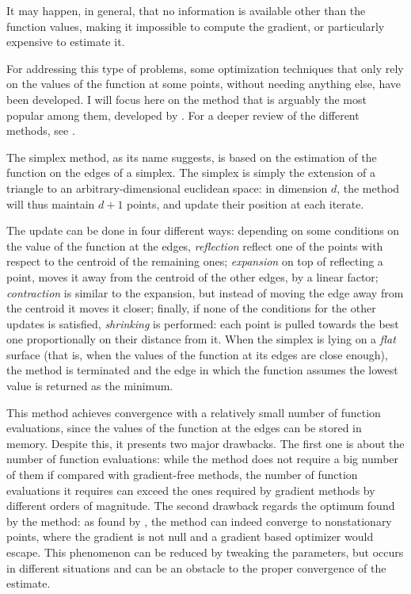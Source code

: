 It may happen, in general, that no information is available other than the function values,
making it impossible to compute the gradient,
or particularly expensive to estimate it.

For addressing this type of problems, some optimization techniques that only rely on the values of the function at some points,
without needing anything else,
have been developed.
I will focus here on the method that is arguably the most popular among them,
developed by \textcite{10.1093/comjnl/7.4.308}.
For a deeper review of the different methods, see \cite{10.5555/1508119}.

The simplex method, as its name suggests, is based on the estimation of the function on the edges of a simplex.
The simplex is simply the extension of a triangle to an arbitrary-dimensional euclidean space:
in dimension \(d\), the method will thus maintain \(d+1\) points,
and update their position at each iterate.

The update can be done in four different ways:
depending on some conditions on the value of the function at the edges,
\textit{reflection} reflect one of the points with respect to the centroid of the remaining ones;
\textit{expansion} on top of reflecting a point, moves it away from the centroid of the other edges, by a linear factor;
\textit{contraction} is similar to the expansion, but instead of moving the edge away from the centroid it moves it closer;
finally, if none of the conditions for the other updates is satisfied,
\textit{shrinking} is performed:
each point is pulled towards the best one proportionally on their distance from it.
When the simplex is lying on a \textit{flat} surface (that is, when the values of the function at its edges are close enough),
the method is terminated and the edge in which the function assumes the lowest value is returned as the minimum.

This method achieves convergence with a relatively small number of function evaluations,
since the values of the function at the edges can be stored in memory.
Despite this, it presents two major drawbacks.
The first one is about the number of function evaluations:
while the method does not require a big number of them if compared with gradient-free methods,
the number of function evaluations it requires can exceed the ones required by gradient methods by different orders of magnitude.
The second drawback regards the optimum found by the method:
as found by \textcite{doi:10.1137/S1052623496303482},
the method can indeed converge to nonstationary points,
where the gradient is not null and a gradient based optimizer would escape.
This phenomenon can be reduced by tweaking the parameters,
but occurs in different situations and can be an obstacle to the proper convergence of the estimate.

